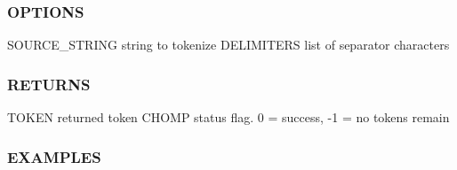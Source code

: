 \subsubsection*{O\+P\+T\+I\+O\+NS}

S\+O\+U\+R\+C\+E\+\_\+\+S\+T\+R\+I\+NG string to tokenize D\+E\+L\+I\+M\+I\+T\+E\+RS list of separator characters

\subsubsection*{R\+E\+T\+U\+R\+NS}

T\+O\+K\+EN returned token C\+H\+O\+MP status flag. 0 = success, -\/1 = no tokens remain

\subsubsection*{E\+X\+A\+M\+P\+L\+ES}

